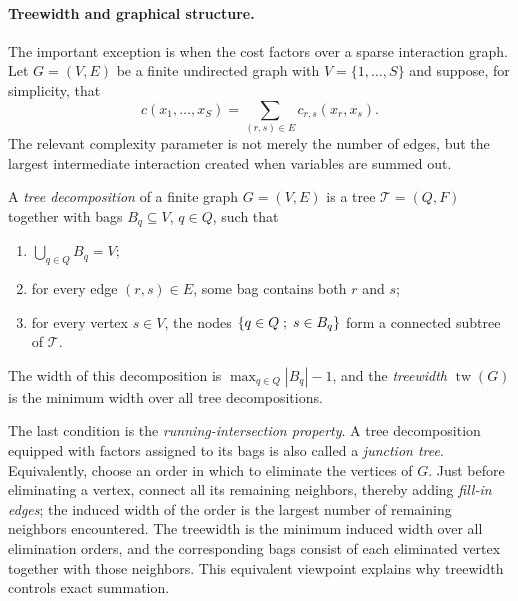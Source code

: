 \paragraph{Treewidth and graphical structure.}

The important exception is when the cost factors over a sparse interaction graph. Let $G=(V,E)$ be a finite undirected graph with $V=\{1,\ldots,S\}$ and suppose, for simplicity, that
\begin{equation}\label{eq-multimarginal-graph-cost}
	c(x_1,\ldots,x_S)
	=
	\sum_{(r,s)\in E}c_{r,s}(x_r,x_s).
\end{equation}
The relevant complexity parameter is not merely the number of edges, but the largest intermediate interaction created when variables are summed out.

\begin{defn}\label{def-treewidth}
	A \emph{tree decomposition} of a finite graph $G=(V,E)$ is a tree $\mathcal T=(Q,F)$ together with bags $B_q\subseteq V$, $q\in Q$, such that
	\begin{enumerate}
		\item $\bigcup_{q\in Q}B_q=V$;
		\item for every edge $(r,s)\in E$, some bag contains both $r$ and $s$;
		\item for every vertex $s\in V$, the nodes $\left\{ q\in Q \;;\; s\in B_q \right\}$ form a connected subtree of $\mathcal T$.
	\end{enumerate}
	The width of this decomposition is $\max_{q\in Q}|B_q|-1$, and the \emph{treewidth} $\operatorname{tw}(G)$ is the minimum width over all tree decompositions.
\end{defn}

The last condition is the \emph{running-intersection property}. A tree decomposition equipped with factors assigned to its bags is also called a \emph{junction tree}. Equivalently, choose an order in which to eliminate the vertices of $G$. Just before eliminating a vertex, connect all its remaining neighbors, thereby adding \emph{fill-in edges}; the induced width of the order is the largest number of remaining neighbors encountered. The treewidth is the minimum induced width over all elimination orders, and the corresponding bags consist of each eliminated vertex together with those neighbors. This equivalent viewpoint explains why treewidth controls exact summation.

